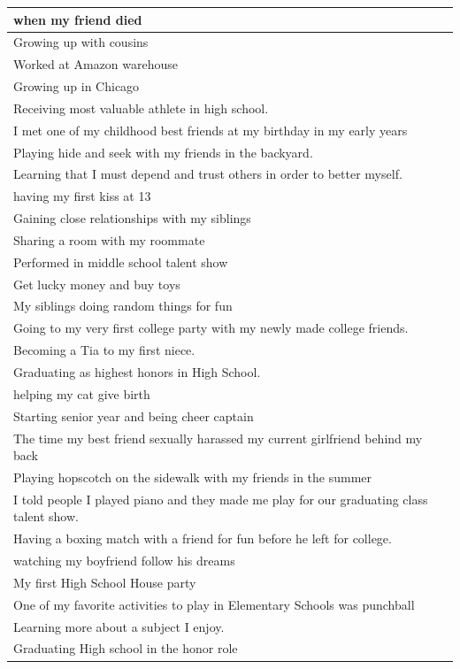 \documentclass[
  .7em,
  letterpaper,
  DIV=11,
  numbers=noendperiod]{scrartcl}
\begin{document}
\begin{table}
\begin{tabular}{l}
\hline
when my friend died\\
\hline
Growing up with cousins\\
\hline
Worked at Amazon warehouse\\
\hline
Growing up in Chicago\\
\hline
Receiving most valuable athlete in high school.\\
\hline
I met one of my childhood best friends at my birthday in my early years\\
\hline
Playing hide and seek with my friends in the backyard.\\
\hline
Learning that I must depend and trust others in order to better myself.\\
\hline
having my first kiss at 13\\
\hline
Gaining close relationships with my siblings\\
\hline
Sharing a room with my roommate\\
\hline
Performed in middle school talent show\\
\hline
Get lucky money and buy toys\\
\hline
My siblings doing random things for fun\\
\hline
Going to my very first college party with my newly made college friends.\\
\hline
Becoming a Tia to my first niece.\\
\hline
Graduating as highest honors in High School.\\
\hline
helping my cat give birth\\
\hline
Starting senior year and being cheer captain\\
\hline
The time my best friend sexually harassed my current girlfriend behind my back\\
\hline
Playing hopscotch on the sidewalk with my friends in the summer\\
\hline
I told people I played piano and they made me play for our graduating class talent show.\\
\hline
Having a boxing match with a friend for fun before he left for college.\\
\hline
watching my boyfriend follow his dreams\\
\hline
My first High School House party\\
\hline
One of my favorite activities to play in Elementary Schools was punchball\\
\hline
Learning more about a subject I enjoy.\\
\hline
Graduating High school in the honor role\\

\end{tabular}
\end{table}
\end{document}
